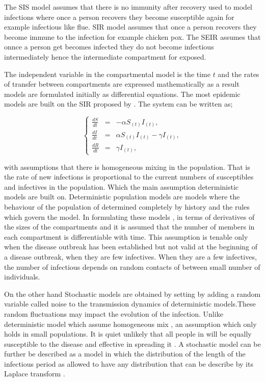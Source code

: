 The SIS model assumes that there is no immunity after recovery used to model infections where once a person recovers they become susceptible again for example infectious like flue. SIR model assumes that once a person recovers they become immune to the infection for example chicken pox. The SEIR assumes that onnce a person get becomes infected they do not  become infectious intermediately hence the intermediate compartment for exposed. 

The independent variable in the compartmental model is the time $t$ and the rates of transfer between compartments are expressed mathematically as a result models are formulated initially as differential equations. The most epidemic models are built on the SIR proposed by \cite{m1925applications}. The system can be written as;


\begin{center}
\begin{equation} \label{eqn1_1}
\left\lbrace \begin{array}{ccl}
\frac{dS}{dt} &= &-\alpha S_{(t)} I_{(t)},\\
 \frac{dI}{dt} &=& \alpha S_{(t)} I_{(t)} - \gamma  I_{(t)}, \\
 \frac{dR}{dt} &= &\gamma  I_{(t)},
\end{array} \right. 
\end{equation}
\end{center}

 with assumptions that there is homogeneous mixing in the population. That is the rate of new infections is proportional to the current numbers of susceptibles and infectives in the population. Which the main assumption deterministic models are built on. Deterministic population  models are models where the behaviour of the population of determined completely by history and the rules which govern the model. In formulating these models , in terms of derivatives of the sizes of the compartments and it is assumed that the number of members in each compartment is differentiable with time. This assumption is tenable only when the disease outbreak has been established  but not valid at the beginning of a disease outbreak, when they are few infectives. When they are a few infectives, the number of infectious depends on random contacts of between small number of individuals.
 
 On the other hand Stochastic models are obtained by setting by adding a random variable called noise to the transmission dynamics of deterministic models.These random fluctuations may impact the evolution of the infection. Unlike deterministic model which assume homogeneous mix , an assumption which only holds in small populations. It is quiet unlikely that all people in will be equally susceptible to the disease and effective in spreading it \citep{ball1985deterministic}. A stochastic model can be further be described as a model in which the distribution of the length of the infectious period as allowed to have any distribution that can be describe by its Laplace transform \citep{addy1991generalized}.
 
